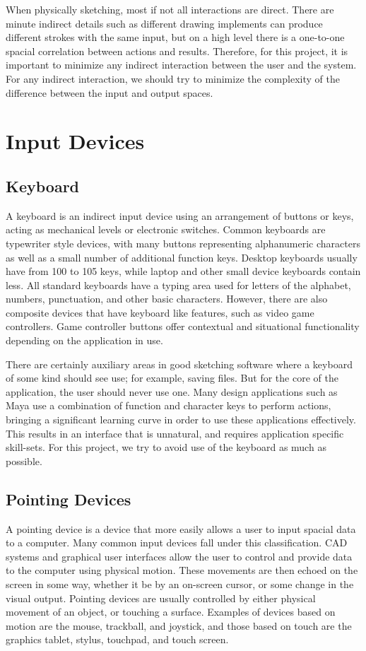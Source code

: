 When physically sketching, most if not all interactions are direct. 
There are minute indirect details such as different drawing implements can produce different strokes with the same input, but on a high level there is a one-to-one spacial correlation between actions and results.
Therefore, for this project, it is important to minimize any indirect interaction between the user and the system.
For any indirect interaction, we should try to minimize the complexity of the difference between the input and output spaces.

\section{Input Devices}
\subsection{Keyboard}

A keyboard is an indirect input device using an arrangement of buttons or keys, acting as mechanical levels or electronic switches. 
Common keyboards are typewriter style devices, with many buttons representing alphanumeric characters as well as a small number of additional function keys.
Desktop keyboards usually have from 100 to 105 keys, while laptop and other small device keyboards contain less.
All standard keyboards have a typing area used for letters of the alphabet, numbers, punctuation, and other basic characters.
However, there are also composite devices that have keyboard like features, such as video game controllers. 
Game controller buttons offer contextual and situational functionality depending on the application in use.


There are certainly auxiliary areas in good sketching software where a keyboard of some kind should see use; for example, saving files. 
But for the core of the application, the user should never use one. 
Many design applications such as Maya use a combination of function and character keys to perform actions, bringing a significant learning curve in order to use these applications effectively.
This results in an interface that is unnatural, and requires application specific skill-sets.
For this project, we try to avoid use of the keyboard as much as possible.


\subsection{Pointing Devices}
 A pointing device is a device that more easily allows a user to input spacial data to a computer. 
 Many common input devices fall under this classification. 
 CAD systems and graphical user interfaces allow the user to control and provide data to the computer using physical motion.
 These movements are then echoed on the screen in some way, whether it be by an on-screen cursor, or some change in the visual output.
 Pointing devices are usually controlled by either physical movement of an object, or touching a surface.
 Examples of devices based on motion are the mouse, trackball, and joystick, and those based on touch are the graphics tablet, stylus, touchpad, and touch screen.
 
